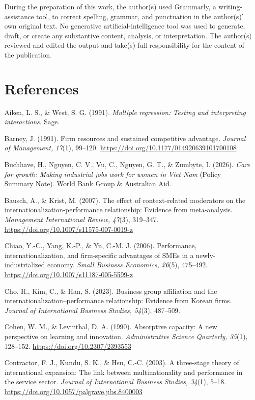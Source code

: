 \documentclass[
  12pt]{article}
\begin{document}
During the preparation of this work, the author(s) used Grammarly, a
writing-assistance tool, to correct spelling, grammar, and punctuation
in the author(s)' own original text. No generative
artificial-intelligence tool was used to generate, draft, or create any
substantive content, analysis, or interpretation. The author(s) reviewed
and edited the output and take(s) full responsibility for the content of
the publication.

\hypertarget{references}{%
\section{References}\label{references}}

Aiken, L. S., \& West, S. G. (1991). \emph{Multiple regression: Testing
and interpreting interactions}. Sage.

Barney, J. (1991). Firm resources and sustained competitive advantage.
\emph{Journal of Management, 17}(1), 99--120.
\url{https://doi.org/10.1177/014920639101700108}

Buchhave, H., Nguyen, C. V., Vu, C., Nguyen, G. T., \& Zumbyte, I.
(2026). \emph{Care for growth: Making industrial jobs work for women in
Viet Nam} (Policy Summary Note). World Bank Group \& Australian Aid.

Bausch, A., \& Krist, M. (2007). The effect of context-related
moderators on the internationalization-performance relationship:
Evidence from meta-analysis. \emph{Management International Review,
47}(3), 319--347. \url{https://doi.org/10.1007/s11575-007-0019-z}

Chiao, Y.-C., Yang, K.-P., \& Yu, C.-M. J. (2006). Performance,
internationalization, and firm-specific advantages of SMEs in a
newly-industrialized economy. \emph{Small Business Economics, 26}(5),
475--492. \url{https://doi.org/10.1007/s11187-005-5599-z}

Cho, H., Kim, C., \& Han, S. (2023). Business group affiliation and the
internationalization--performance relationship: Evidence from Korean
firms. \emph{Journal of International Business Studies, 54}(3),
487--509.

Cohen, W. M., \& Levinthal, D. A. (1990). Absorptive capacity: A new
perspective on learning and innovation. \emph{Administrative Science
Quarterly, 35}(1), 128--152. \url{https://doi.org/10.2307/2393553}

Contractor, F. J., Kundu, S. K., \& Hsu, C.-C. (2003). A three-stage
theory of international expansion: The link between multinationality and
performance in the service sector. \emph{Journal of International
Business Studies, 34}(1), 5--18.
\url{https://doi.org/10.1057/palgrave.jibs.8400003}
\end{document}
